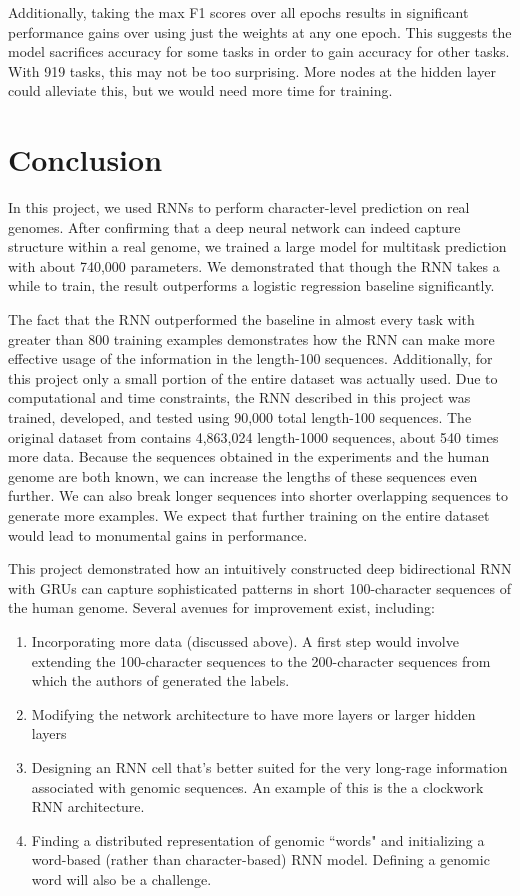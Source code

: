 \documentclass{article} %
\begin{document}
Additionally, taking the max F1 scores over all epochs results in significant performance gains over using just the weights at any one epoch. This suggests the model sacrifices accuracy for some tasks in order to gain accuracy for other tasks. With 919 tasks, this may not be too surprising. More nodes at the hidden layer could alleviate this, but we would need more time for training.

\section{Conclusion}
In this project, we used RNNs to perform character-level prediction on real genomes. After confirming that a deep neural network can indeed capture structure within a real genome, we trained a large model for multitask prediction with about 740,000 parameters. We demonstrated that though the RNN takes a while to train, the result outperforms a logistic regression baseline significantly.

The fact that the RNN outperformed the baseline in almost every task with greater than 800 training examples demonstrates how the RNN can make more effective usage of the information in the length-100 sequences. Additionally, for this project only a small portion of the entire dataset was actually used. Due to computational and time constraints, the RNN described in this project was trained, developed, and tested using 90,000 total length-100 sequences. The original dataset from \cite{zhou2015predicting} contains 4,863,024 length-1000 sequences, about 540 times more data. Because the sequences obtained in the experiments and the human genome are both known, we can increase the lengths of these sequences even further. We can also break longer sequences into shorter overlapping sequences to generate more examples. We expect that further training on the entire dataset would lead to monumental gains in performance. 

This project demonstrated how an intuitively constructed deep bidirectional RNN with GRUs can capture sophisticated patterns in short 100-character sequences of the human genome. Several avenues for improvement exist, including:
\begin{enumerate}
	\item Incorporating more data (discussed above). A first step would involve extending the 100-character sequences to the 200-character sequences from which the authors of \cite{zhou2015predicting} generated the labels. 
	\item Modifying the network architecture to have more layers or larger hidden layers
	\item Designing an RNN cell that's better suited for the very long-rage information associated with genomic sequences. An example of this is the a clockwork RNN \cite{koutnik2014clockwork} architecture.
	\item Finding a distributed representation of genomic ``words" and initializing a word-based (rather than character-based) RNN model. Defining a genomic word will also be a challenge.
\end{enumerate}
\end{document}
